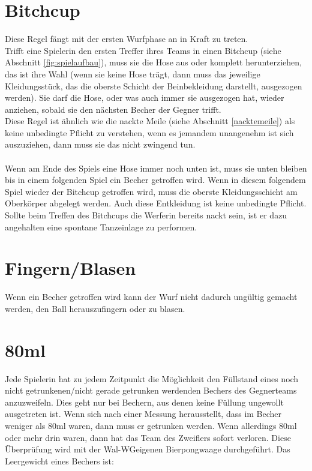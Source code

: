 \documentclass[a5paper, 12pt]{book}
\begin{document}
\section{Bitchcup}\label{bitchcup}
Diese Regel fängt mit der ersten Wurfphase an in Kraft zu treten.\\Trifft eine Spielerin den ersten Treffer ihres Teams in einen Bitchcup (siehe Abschnitt \ref{fig:spielaufbau}), muss sie die Hose aus oder komplett herunterziehen, das ist ihre Wahl (wenn sie keine Hose trägt, dann muss das jeweilige Kleidungsstück, das die oberste Schicht der Beinbekleidung darstellt, ausgezogen werden). Sie darf die Hose, oder was auch immer sie ausgezogen hat, wieder anziehen, sobald sie den nächsten Becher der Gegner trifft. \\
Diese Regel ist ähnlich wie die nackte Meile (siehe Abschnitt \ref{nacktemeile}) als keine unbedingte Pflicht zu verstehen, wenn es jemandem unangenehm ist sich auszuziehen, dann muss sie das nicht zwingend tun.\\\\
Wenn am Ende des Spiels eine Hose immer noch unten ist, muss sie unten bleiben bis in einem folgenden Spiel ein Becher getroffen wird. Wenn in diesem folgendem Spiel wieder der Bitchcup getroffen wird, muss die oberste Kleidungsschicht am Oberkörper abgelegt werden. Auch diese Entkleidung ist keine unbedingte Pflicht.\\
Sollte beim Treffen des Bitchcups die Werferin bereits nackt sein, ist er dazu angehalten eine spontane Tanzeinlage zu performen.
\section{Fingern/Blasen}\label{fingern/blasen}
Wenn ein Becher getroffen wird kann der Wurf nicht dadurch ungültig gemacht werden, den Ball herauszufingern oder zu blasen.
\section{80ml}\label{80ml}
Jede Spielerin hat zu jedem Zeitpunkt die Möglichkeit den Füllstand eines noch nicht getrunkenen/nicht gerade getrunken werdenden Bechers des Gegnerteams anzuzweifeln. Dies geht nur bei Bechern, aus denen keine Füllung ungewollt ausgetreten ist. Wenn sich nach einer Messung herausstellt, dass im Becher weniger als 80ml waren, dann muss er getrunken werden. Wenn allerdings 80ml oder mehr drin waren, dann hat das Team des Zweiflers sofort verloren. Diese Überprüfung wird mit der Wal-WG\texttrademark eigenen Bierpongwaage durchgeführt. Das Leergewicht eines Bechers ist:
\end{document}
